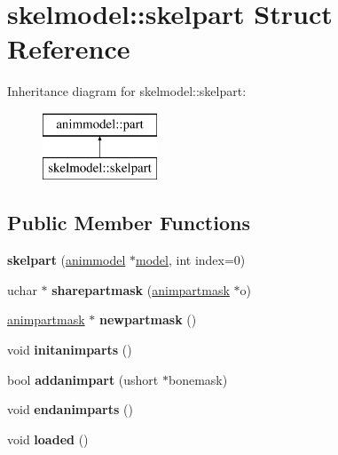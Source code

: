 \hypertarget{structskelmodel_1_1skelpart}{}\section{skelmodel\+:\+:skelpart Struct Reference}
\label{structskelmodel_1_1skelpart}
Inheritance diagram for skelmodel\+:\+:skelpart\+:\begin{figure}[H]
\begin{center}
\leavevmode
\includegraphics[height=2.000000cm]{structskelmodel_1_1skelpart}
\end{center}
\end{figure}
\subsection*{Public Member Functions}
\begin{DoxyCompactItemize}
\item 
\mbox{\label{structskelmodel_1_1skelpart_ad8d7aa4474b7f74d9ee73a980bf493c0}} 
{\bfseries skelpart} (\hyperlink{structanimmodel}{animmodel} $\ast$\hyperlink{structmodel}{model}, int index=0)
\item 
\mbox{\label{structskelmodel_1_1skelpart_a7356b68a61c3b70f5bfb4208563eb5f7}} 
uchar $\ast$ {\bfseries sharepartmask} (\hyperlink{structskelmodel_1_1animpartmask}{animpartmask} $\ast$o)
\item 
\mbox{\label{structskelmodel_1_1skelpart_a4eb525edc2a5c500da97ca7da31539e0}} 
\hyperlink{structskelmodel_1_1animpartmask}{animpartmask} $\ast$ {\bfseries newpartmask} ()
\item 
\mbox{\label{structskelmodel_1_1skelpart_a1d141726b675e12adf35d8d3182674bc}} 
void {\bfseries initanimparts} ()
\item 
\mbox{\label{structskelmodel_1_1skelpart_a012c9901f32ef6e8e0b61fb1fb899e4a}} 
bool {\bfseries addanimpart} (ushort $\ast$bonemask)
\item 
\mbox{\label{structskelmodel_1_1skelpart_a9f53615363ff07582b0ec8a42ce80461}} 
void {\bfseries endanimparts} ()
\item 
\mbox{\label{structskelmodel_1_1skelpart_a0eb516c35ff8a281a7f81f41a46f667f}} 
void {\bfseries loaded} ()
\end{DoxyCompactItemize}
